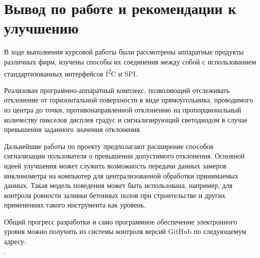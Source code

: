 \documentclass[document.tex]{subfiles}
\begin{document}
\section{Вывод по работе и рекомендации к улучшению}
В ходе выполнения курсовой работы были рассмотрены аппаратные продукты различных фирм, изучены способы их соединения между собой с использованием стандартизованных интерфейсов
I\textsuperscript{2}C и SPI.

Реализован программно-аппаратный комплекс, позволяющий отслеживать отклонение от горизонтальной поверхности в виде прямоугольника, проводимого из центра до точки,
противонаправленной отклонению на пропорциональный количеству пикселов дисплея градус и сигнализирующий светодиодом в случае превышения заданного значения отклонения.
 
Дальнейшие работы по проекту предполагают расширение способов сигнали\-зации пользо\-вателя о превышении допустимого отклонения. Основной идеей улучшения может служить возможность
передачи данных замеров инклинометра на компьютер для централизованной обработки принимаемых данных. Такая модель поведения может быть использована, напри\-мер, для контроля
ровности заливки бетонных полов при строительстве и других применени\-ях такого инстру\-мента как уровень.

Общий прогресс разработки и само программное обеспечение электронного уровня можно получить из
системы контроля версий GitHub по следующемум адресу: \\ .
\end{document}
